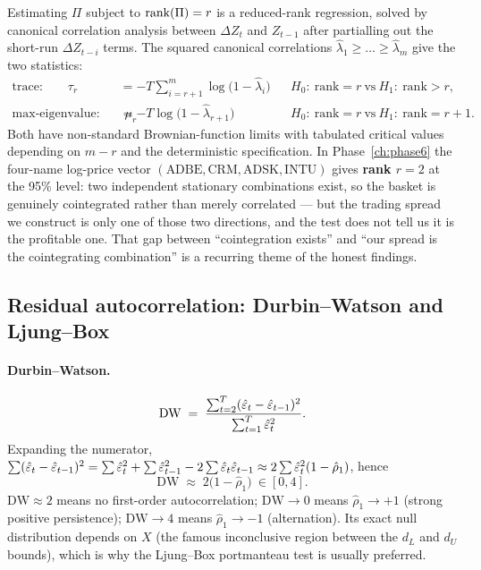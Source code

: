 Estimating $\Pi$ subject to $\operatorname{rank}(\Pi)=r$ is a reduced-rank regression, solved by
canonical correlation analysis between $\Delta Z_t$ and $Z_{t-1}$ after partialling out
the short-run $\Delta Z_{t-i}$ terms. The squared canonical correlations
$\hat\lambda_1\ge\dots\ge\hat\lambda_m$ give the two statistics:
\begin{align}
  \text{trace:}\qquad
  \tau_r &= -T\sum_{i=r+1}^{m}\log\bigl(1-\hat\lambda_i\bigr)
  && H_0:\ \text{rank}=r \ \text{vs}\ H_1:\ \text{rank}>r, \label{eq:johansen:trace}\\
  \text{max-eigenvalue:}\qquad
  \mu_r &= -T\log\bigl(1-\hat\lambda_{r+1}\bigr)
  && H_0:\ \text{rank}=r \ \text{vs}\ H_1:\ \text{rank}=r+1. \label{eq:johansen:max}
\end{align}
Both have non-standard Brownian-function limits with tabulated critical values depending
on $m-r$ and the deterministic specification. In Phase~\ref{ch:phase6} the four-name
log-price vector $(\text{ADBE},\text{CRM},\text{ADSK},\text{INTU})$ gives
\textbf{rank $r=2$} at the 95\% level: two independent stationary combinations exist, so
the basket is genuinely cointegrated rather than merely correlated --- but the trading
spread we construct is only one of those two directions, and the test does not tell us it
is the profitable one. That gap between ``cointegration exists'' and ``our spread is the
cointegrating combination'' is a recurring theme of the honest findings.

\subsection{Residual autocorrelation: Durbin--Watson and Ljung--Box}
\label{sec:ts:autocorr}

\paragraph{Durbin--Watson.}
\begin{equation}
  \mathrm{DW} \;=\; \frac{\sum_{t=2}^{T}(\hat{\varepsilon}_t-\hat{\varepsilon}_{t-1})^2}{\sum_{t=1}^{T}\hat{\varepsilon}_t^2}.
  \label{eq:dw}
\end{equation}
Expanding the numerator,
$\sum(\hat{\varepsilon}_t-\hat{\varepsilon}_{t-1})^2 = \sum\hat{\varepsilon}_t^2+\sum\hat{\varepsilon}_{t-1}^2-2\sum\hat{\varepsilon}_t\hat{\varepsilon}_{t-1}
\approx 2\sum\hat{\varepsilon}_t^2(1-\hat\rho_1)$, hence
\begin{equation}
  \mathrm{DW}\;\approx\;2\bigl(1-\hat\rho_1\bigr)\ \in[0,4].
  \label{eq:dw:rho}
\end{equation}
$\mathrm{DW}\approx2$ means no first-order autocorrelation; $\mathrm{DW}\to0$ means
$\hat\rho_1\to+1$ (strong positive persistence); $\mathrm{DW}\to4$ means
$\hat\rho_1\to-1$ (alternation). Its exact null distribution depends on $X$ (the famous
inconclusive region between the $d_L$ and $d_U$ bounds), which is why the Ljung--Box
portmanteau test is usually preferred.


